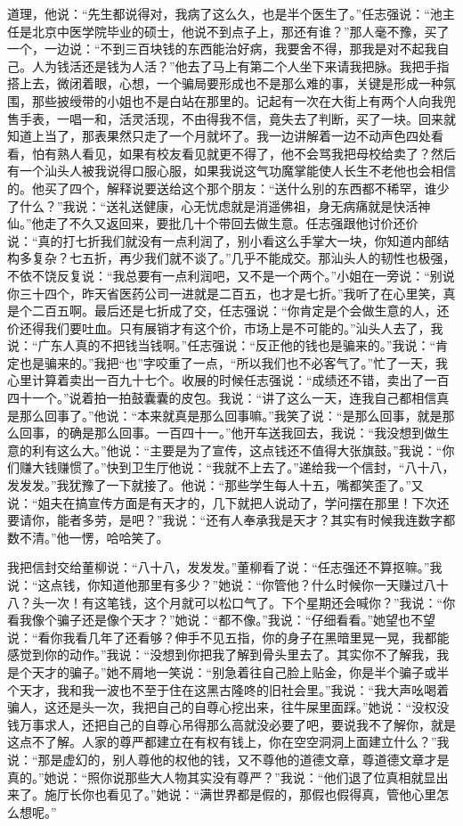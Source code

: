 \documentclass[12pt,oneside]{book}
\begin{document}
道理，他说：``先生都说得对，我病了这么久，也是半个医生了。''任志强说：``池主任是北京中医学院毕业的硕士，他说不到点子上，那还有谁？''那人毫不豫，买了一个，一边说：``不到三百块钱的东西能治好病，我要舍不得，那我是对不起我自己。人为钱活还是钱为人活？''他去了马上有第二个人坐下来请我把脉。我把手指搭上去，微闭着眼，心想，一个骗局要形成也不是那么难的事，关键是形成一种氛围，那些披绶带的小姐也不是白站在那里的。记起有一次在大街上有两个人向我兜售手表，一唱一和，活灵活现，不由得我不信，竟失去了判断，买了一块。回来就知道上当了，那表果然只走了一个月就坏了。我一边讲解着一边不动声色四处看看，怕有熟人看见，如果有校友看见就更不得了，他不会骂我把母校给卖了？然后有一个汕头人被我说得口服心服，如果我说这气功魔掌能使人长生不老他也会相信的。他买了四个，解释说要送给这个那个朋友：``送什么别的东西都不稀罕，谁少了什么？''我说：``送礼送健康，心无忧虑就是消遥佛祖，身无病痛就是快活神仙。''他走了不久又返回来，要批几十个带回去做生意。任志强跟他讨价还价说：``真的打七折我们就没有一点利润了，别小看这么手掌大一块，你知道内部结构多复杂？七五折，再少我们就不谈了。''几乎不能成交。那汕头人的韧性也极强，不依不饶反复说：``我总要有一点利润吧，又不是一个两个。''小姐在一旁说：``别说你三十四个，昨天省医药公司一进就是二百五，也才是七折。''我听了在心里笑，真是个二百五啊。最后还是七折成了交，任志强说：``你肯定是个会做生意的人，还价还得我们要吐血。只有展销才有这个价，市场上是不可能的。''汕头人去了，我说：``广东人真的不把钱当钱啊。''任志强说：``反正他的钱也是骗来的。''我说：``肯定也是骗来的。''我把``也''字咬重了一点，``所以我们也不必客气了。''忙了一天，我心里计算着卖出一百九十七个。收展的时候任志强说：``成绩还不错，卖出了一百四十一个。''说着拍一拍鼓囊囊的皮包。我说：``讲了这么一天，连我自己都相信真是那么回事了。''他说：``本来就真是那么回事嘛。''我笑了说：``是那么回事，就是那么回事，的确是那么回事。一百四十一。''他开车送我回去，我说：``我没想到做生意的利有这么大。''他说：``主要是为了宣传，这点钱还不值得大张旗鼓。''我说：``你们赚大钱赚惯了。''快到卫生厅他说：``我就不上去了。''递给我一个信封，``八十八，发发发。''我犹豫了一下就接了。他说：``那些学生每人十五，嘴都笑歪了。''又说：``姐夫在搞宣传方面是有天才的，几下就把人说动了，学问摆在那里！下次还要请你，能者多劳，是吧？''我说：``还有人奉承我是天才？其实有时候我连数字都数不清。''他一愣，哈哈笑了。

我把信封交给董柳说：``八十八，发发发。''董柳看了说：``任志强还不算抠嘛。''我说：``这点钱，你知道他那里有多少？''她说：``你管他？什么时候你一天赚过八十八？头一次！有这笔钱，这个月就可以松口气了。下个星期还会喊你？''我说：``你看我像个骗子还是像个天才？''她说：``都不像。''我说：``仔细看看。''她望也不望说：``看你我看几年了还看够？伸手不见五指，你的身子在黑暗里晃一晃，我都能感觉到你的动作。''我说：``没想到你把我了解到骨头里去了。其实你不了解我，我是个天才的骗子。''她不屑地一笑说：``别急着往自己脸上贴金，你是半个骗子或半个天才，我和我一波也不至于住在这黑古隆咚的旧社会里。''我说：``我大声吆喝着骗人，这还是头一次，我把自己的自尊心挖出来，往牛屎里面踩。''她说：``没权没钱万事求人，还把自己的自尊心吊得那么高就没必要了吧，要说我不了解你，就是这点不了解。人家的尊严都建立在有权有钱上，你在空空洞洞上面建立什么？''我说：``那是虚幻的，别人尊他的权他的钱，又不尊他的道德文章，尊道德文章才是真的。''她说：``照你说那些大人物其实没有尊严？''我说：``他们退了位真相就显出来了。施厅长你也看见了。''她说：``满世界都是假的，那假也假得真，管他心里怎么想呢。''
\end{document}
